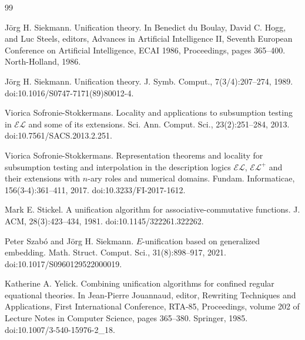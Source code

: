 \documentclass[10pt,a4paper]{amsart}
\begin{document}
\begin{thebibliography}{99}
\par\noindent  [52]  Jörg H. Siekmann.  Unification theory.  In Benedict du Boulay, David C. Hogg, and Luc Steels, editors, Advances in Artificial Intelligence II, Seventh European Conference on Artificial Intelligence, ECAI 1986, Proceedings, pages 365–400. North-Holland, 1986.  
 
\par\noindent  [53]  Jörg H. Siekmann.  Unification theory.  J. Symb. Comput., 7(3/4):207–274, 1989.  doi:10.1016/S0747-7171(89)80012-4.  
 
\par\noindent  [54]  Viorica Sofronie-Stokkermans.  Locality and applications to subsumption testing in $\mathcal{EL}$ and some of its extensions.  Sci. Ann. Comput. Sci., 23(2):251–284, 2013.  doi:10.7561/SACS.2013.2.251.  
 
\par\noindent  [55]  Viorica Sofronie-Stokkermans.  Representation theorems and locality for subsumption testing and interpolation in the description logics $\mathcal{EL}$, $\mathcal{EL}^{+}$ and their extensions with $n$-ary roles and numerical domains.  Fundam. Informaticae, 156(3-4):361–411, 2017.  doi:10.3233/FI-2017-1612.  
 
\par\noindent  [56]  Mark E. Stickel.  A unification algorithm for associative-commutative functions.  J. ACM, 28(3):423–434, 1981.  doi:10.1145/322261.322262.  
 
\par\noindent  [57]  Peter Szabó and Jörg H. Siekmann.  $E$-unification based on generalized embedding.  Math. Struct. Comput. Sci., 31(8):898–917, 2021.  doi:10.1017/S0960129522000019.  
 
\par\noindent  [58]  Katherine A. Yelick.  Combining unification algorithms for confined regular equational theories.  In Jean-Pierre Jouannaud, editor, Rewriting Techniques and Applications, First International Conference, RTA-85, Proceedings, volume 202 of Lecture Notes in Computer Science, pages 365–380. Springer, 1985.  doi:10.1007/3-540-15976-2\_18.  
  
\end{thebibliography}
\end{document}

